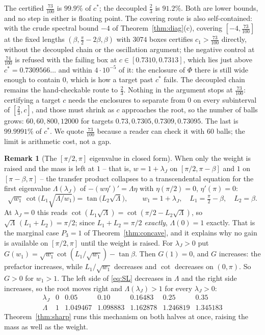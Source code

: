 \documentclass[11pt]{article}
\theoremstyle{definition}
\newtheorem{remark}[theorem]{Remark}
\begin{document}
The certified $\tfrac{73}{100}$ is $99.9\%$ of $c^\ast$; the decoupled $\tfrac23$ is
$91.2\%$. Both are lower bounds, and no step in either is floating point. The covering
route is also self-contained: with the crude spectral bound $-4$ of
Theorem~\ref{thm:diag}(c), covering $[-4,\tfrac{73}{100}]$ at the fixed lengths
$(\beta,\tfrac\pi2-2\beta,\beta)$ with $3074$ boxes certifies $c_1>\tfrac{73}{100}$
directly, without the decoupled chain or the oscillation argument; the negative control
at $\tfrac{74}{100}$ is refused with the failing box at $c\in[0.7310,0.7313]$, which lies
just above $c^\ast=0.7309566\ldots$ and within $4\cdot10^{-5}$ of it: the enclosure of
$\Phi$ there is still wide enough to contain $0$, which is how a target past $c^\ast$
fails. The decoupled chain remains the hand-checkable route to
$\tfrac23$. Nothing in the
argument stops at $\tfrac{73}{100}$: certifying a target $c$ needs the enclosures to
separate from $0$ on every subinterval of $[\tfrac23,c]$, and those must shrink as $c$
approaches the root, so the number of balls grows: $60,60,800,12000$ for targets
$0.73,0.7305,0.7309,0.73095$. The last is $99.9991\%$ of $c^\ast$. We quote
$\tfrac{73}{100}$ because a reader can check it with $60$ balls; the limit is arithmetic
cost, not a gap.

\begin{remark}[{The $[\pi/2,\pi]$ eigenvalue in closed form}]\label{rem:SL}
When only the weight is raised and the mass is left at $1$ -- that is, $w=1+\lambda_J$ on
$[\pi/2,\pi-\beta]$ and $1$ on $[\pi-\beta,\pi]$ -- the transfer product collapses to a
transcendental equation for the first eigenvalue $\Lambda(\lambda_J)$ of
$-(w\eta')'=\Lambda\eta$ with $\eta(\pi/2)=0$, $\eta'(\pi)=0$:
\begin{equation}\label{eq:SL}
  \sqrt{w_1}\,\cot\bigl(L_1\sqrt{\Lambda/w_1}\bigr)=\tan\bigl(L_2\sqrt\Lambda\bigr),
  \qquad w_1=1+\lambda_J,\quad L_1=\tfrac\pi2-\beta,\quad L_2=\beta .
\end{equation}
At $\lambda_J=0$ this reads $\cot(L_1\sqrt\Lambda)=\cot(\pi/2-L_2\sqrt\Lambda)$, so
$\sqrt\Lambda\,(L_1+L_2)=\pi/2$; since $L_1+L_2=\pi/2$ \emph{exactly}, $\Lambda(0)=1$
exactly. That is the marginal case $P_3=1$ of Theorem~\ref{thm:concave}, and it explains
why no gain is available on $[\pi/2,\pi]$ until the weight is raised. For $\lambda_J>0$ put
$G(w_1)=\sqrt{w_1}\cot(L_1/\sqrt{w_1})-\tan\beta$. Then $G(1)=0$, and $G$ increases: the
prefactor increases, while $L_1/\sqrt{w_1}$ decreases and $\cot$ decreases on $(0,\pi)$.
So $G>0$ for $w_1>1$. The left side of \eqref{eq:SL} decreases in $\Lambda$ and the right
side increases, so the root moves right and $\Lambda(\lambda_J)>1$ for every $\lambda_J>0$:
\[
  \begin{array}{r|cccccc}
    \lambda_J & 0 & 0.05 & 0.10 & 0.16483 & 0.25 & 0.35\\\hline
    \Lambda & 1 & 1.049467 & 1.098883 & 1.162878 & 1.246819 & 1.345183
  \end{array}
\]
Theorem~\ref{thm:sharp} runs this mechanism on both halves at once, raising the mass as
well as the weight.
\end{remark}
\end{document}
